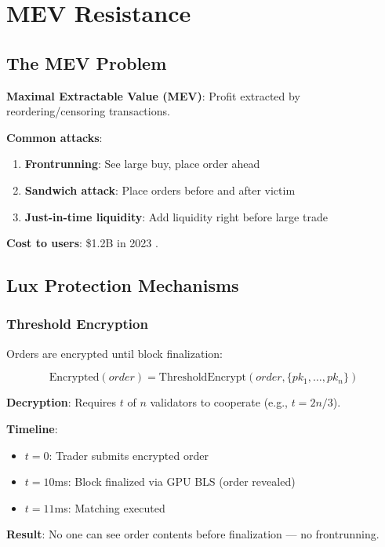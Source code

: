 \section{MEV Resistance}


\subsection{The MEV Problem}

\textbf{Maximal Extractable Value (MEV)}: Profit extracted by reordering/censoring transactions.

\textbf{Common attacks}:
\begin{enumerate}
    \item \textbf{Frontrunning}: See large buy, place order ahead
    \item \textbf{Sandwich attack}: Place orders before and after victim
    \item \textbf{Just-in-time liquidity}: Add liquidity right before large trade
\end{enumerate}

\textbf{Cost to users}: \$1.2B in 2023 \cite{flashbots2024}.

\subsection{Lux Protection Mechanisms}

\subsubsection{Threshold Encryption}

Orders are encrypted until block finalization:

\begin{equation}
\text{Encrypted}(order) = \text{ThresholdEncrypt}(order, \{pk_1, \ldots, pk_n\})
\end{equation}

\textbf{Decryption}: Requires $t$ of $n$ validators to cooperate (e.g., $t = 2n/3$).

\textbf{Timeline}:
\begin{itemize}
    \item $t=0$: Trader submits encrypted order
    \item $t=10$ms: Block finalized via GPU BLS (order revealed)
    \item $t=11$ms: Matching executed
\end{itemize}

\textbf{Result}: No one can see order contents before finalization --- no frontrunning.

